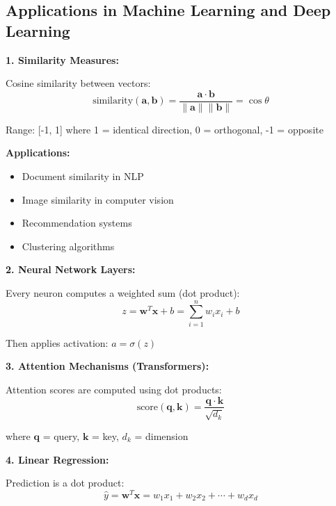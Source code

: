 \documentclass[12pt,a4paper]{article}
\theoremstyle{definition}
\begin{document}
\subsection{Applications in Machine Learning and Deep Learning}

\begin{tcolorbox}[enhanced,breakable,colback=red!5!white,colframe=red!75!black,title=Critical ML/DL Applications of Dot Product]

\textbf{1. Similarity Measures:}

Cosine similarity between vectors:
\begin{equation}
\text{similarity}(\mathbf{a}, \mathbf{b}) = \frac{\mathbf{a} \cdot \mathbf{b}}{\|\mathbf{a}\| \|\mathbf{b}\|} = \cos \theta
\end{equation}

Range: [-1, 1] where 1 = identical direction, 0 = orthogonal, -1 = opposite

\textbf{Applications:}
\begin{itemize}
    \item Document similarity in NLP
    \item Image similarity in computer vision
    \item Recommendation systems
    \item Clustering algorithms
\end{itemize}

\textbf{2. Neural Network Layers:}

Every neuron computes a weighted sum (dot product):
\begin{equation}
z = \mathbf{w}^T\mathbf{x} + b = \sum_{i=1}^{n} w_i x_i + b
\end{equation}

Then applies activation: $a = \sigma(z)$

\textbf{3. Attention Mechanisms (Transformers):}

Attention scores are computed using dot products:
\begin{equation}
\text{score}(\mathbf{q}, \mathbf{k}) = \frac{\mathbf{q} \cdot \mathbf{k}}{\sqrt{d_k}}
\end{equation}

where $\mathbf{q}$ = query, $\mathbf{k}$ = key, $d_k$ = dimension

\textbf{4. Linear Regression:}

Prediction is a dot product:
\begin{equation}
\hat{y} = \mathbf{w}^T\mathbf{x} = w_1x_1 + w_2x_2 + \cdots + w_dx_d
\end{equation}


\end{tcolorbox}
\end{document}
